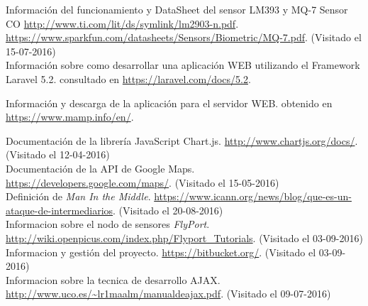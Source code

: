 \begin{thebibliography}{10}
Información del funcionamiento y DataSheet del sensor LM393 y MQ-7 Sensor CO
\url{http://www.ti.com/lit/ds/symlink/lm2903-n.pdf}.
\url{https://www.sparkfun.com/datasheets/Sensors/Biometric/MQ-7.pdf}.
\newblock (Visitado el 15-07-2016) \\

Información sobre como desarrollar una aplicación WEB utilizando el Framework Laravel 5.2.
\newblock consultado en 
\url{https://laravel.com/docs/5.2}.

Información y descarga de la aplicación para el servidor WEB.
\newblock obtenido en 
\url{https://www.mamp.info/en/}.

Documentación de la librería JavaScript Chart.js.
\url{http://www.chartjs.org/docs/}.
\newblock (Visitado el 12-04-2016) \\

Documentación de la API de Google Maps.
\url{https://developers.google.com/maps/}.
\newblock (Visitado el 15-05-2016) \\

Definición de \textit{Man In the Middle}.
\url{https://www.icann.org/news/blog/que-es-un-ataque-de-intermediarios}.
\newblock (Visitado el 20-08-2016) \\

Informacion sobre el nodo de sensores \textit{FlyPort}.
\url{http://wiki.openpicus.com/index.php/Flyport_Tutorials}.
\newblock (Visitado el 03-09-2016) \\

Informacion y gestión del proyecto.
\url{https://bitbucket.org/}.
\newblock (Visitado el 03-09-2016) \\

Informacion sobre la tecnica de desarrollo AJAX.
\url{http://www.uco.es/~lr1maalm/manualdeajax.pdf}.
\newblock (Visitado el 09-07-2016) \\



\end{thebibliography}
